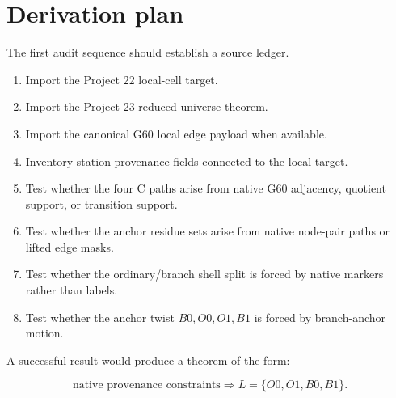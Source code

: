 \section{Derivation plan}

The first audit sequence should establish a source ledger.

\begin{enumerate}[label=(\arabic*)]
\item Import the Project 22 local-cell target.
\item Import the Project 23 reduced-universe theorem.
\item Import the canonical G60 local edge payload when available.
\item Inventory station provenance fields connected to the local target.
\item Test whether the four C paths arise from native G60 adjacency, quotient support, or transition support.
\item Test whether the anchor residue sets arise from native node-pair paths or lifted edge masks.
\item Test whether the ordinary/branch shell split is forced by native markers rather than labels.
\item Test whether the anchor twist \(B0,O0,O1,B1\) is forced by branch-anchor motion.
\end{enumerate}

A successful result would produce a theorem of the form:

\[
    \text{native provenance constraints}
    \Longrightarrow
    L=\{O0,O1,B0,B1\}.
\]
